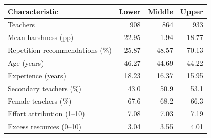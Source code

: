 \begin{tabular}{lrrr}
\toprule
Characteristic & Lower & Middle & Upper \\
\midrule
Teachers & 908 & 864 & 933 \\
Mean harshness (pp) & -22.95 & 1.94 & 18.77 \\
Repetition recommendations (\%) & 25.87 & 48.57 & 70.13 \\
Age (years) & 46.27 & 44.69 & 44.22 \\
Experience (years) & 18.23 & 16.37 & 15.95 \\
Secondary teachers (\%) & 43.0 & 50.9 & 53.1 \\
Female teachers (\%) & 67.6 & 68.2 & 66.3 \\
Effort attribution (1--10) & 7.08 & 7.03 & 7.19 \\
Excess resources (0--10) & 3.04 & 3.55 & 4.01 \\
\bottomrule
\end{tabular}
